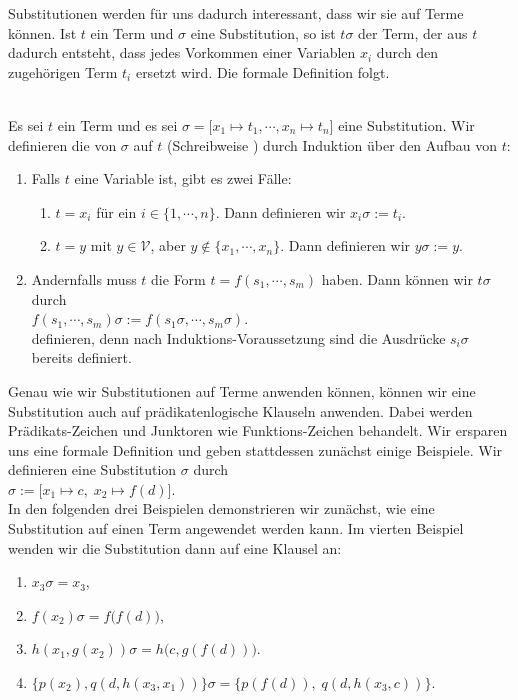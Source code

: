 \noindent
Substitutionen werden für uns dadurch interessant, dass wir sie auf Terme  können.  Ist $t$ ein
Term und $\sigma$ eine Substitution, so ist $t\sigma$ der Term, der aus $t$ dadurch entsteht, dass jedes
Vorkommen einer Variablen $x_i$ durch den zugehörigen Term $t_i$ ersetzt wird.  Die formale Definition folgt. 
\begin{Definition}
\hspace*{\fill} \\
Es sei $t$ ein Term und es sei $\sigma = \bigl[ x_1 \mapsto t_1, \cdots, x_n \mapsto t_n \bigr]$
eine Substitution. Wir definieren die  von $\sigma$ auf $t$ (Schreibweise ) durch Induktion über
den Aufbau von $t$: 
\begin{enumerate}
\item Falls $t$ eine Variable ist, gibt es zwei Fälle:
  \begin{enumerate}
  \item $t = x_i$ für ein $i\in\{1,\cdots,n\}$.  Dann definieren wir \quad  $x_i\sigma := t_i$.
  \item $t = y$ mit $y\in\mathcal{V}$, aber $y \not\in \{x_1,\cdots,x_n\}$. Dann definieren wir \quad $y\sigma := y$.
  \end{enumerate}
\item Andernfalls muss $t$ die Form $t= f(s_1,\cdots,s_m)$ haben. Dann können wir $t\sigma$ durch \\[0.2cm]
      \hspace*{1.3cm} $f(s_1, \cdots, s_m)\sigma := f(s_1\sigma, \cdots, s_m\sigma)$. \\[0.2cm]
      definieren, denn nach Induktions-Voraussetzung sind die Ausdrücke $s_i\sigma$ bereits definiert.      
      \eox
\end{enumerate}
\end{Definition}

Genau wie wir Substitutionen auf Terme anwenden können, können wir eine Substitution
auch auf prädikatenlogische Klauseln anwenden.  Dabei werden Prädikats-Zeichen und
Junktoren wie Funktions-Zeichen behandelt.
Wir ersparen uns eine formale Definition und geben stattdessen zunächst einige Beispiele. 
Wir definieren eine Substitution $\sigma$ durch \\[0.2cm]
\hspace*{1.3cm} $\sigma := \big[ x_1 \mapsto c,\; x_2 \mapsto f(d) \big]$. \\[0.2cm]
In den folgenden drei Beispielen demonstrieren wir zunächst, wie eine Substitution
auf einen Term angewendet werden kann.  Im vierten Beispiel wenden wir die Substitution
dann auf eine Klausel an:
\begin{enumerate}
\item $x_3\sigma = x_3$,
\item $f(x_2)\sigma = f\bigl(f(d)\bigr)$,
\item $h(x_1,g(x_2))\sigma = h\bigl(c,g(f(d))\bigr)$.
\item $\bigl\{ p(x_2), q(d,h(x_3,x_1))\bigr\}\sigma = \bigl\{ p(f(d)),\; q(d,h(x_3,c))\bigr\}$.
\end{enumerate}


